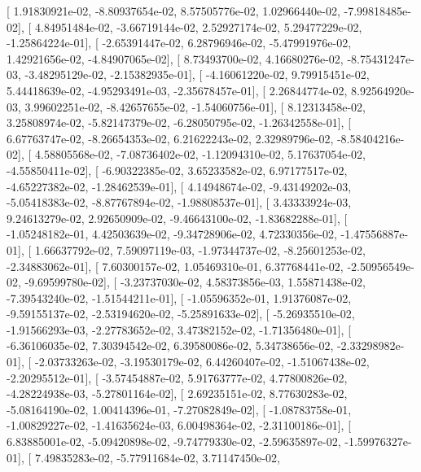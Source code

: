 \documentclass{article}
\begin{document}
       [  1.91830921e-02,  -8.80937654e-02,   8.57505776e-02,
          1.02966440e-02,  -7.99818485e-02],
       [  4.84951484e-02,  -3.66719144e-02,   2.52927174e-02,
          5.29477229e-02,  -1.25864224e-01],
       [ -2.65391447e-02,   6.28796946e-02,  -5.47991976e-02,
          1.42921656e-02,  -4.84907065e-02],
       [  8.73493700e-02,   4.16680276e-02,  -8.75431247e-03,
         -3.48295129e-02,  -2.15382935e-01],
       [ -4.16061220e-02,   9.79915451e-02,   5.44418639e-02,
         -4.95293491e-03,  -2.35678457e-01],
       [  2.26844774e-02,   8.92564920e-03,   3.99602251e-02,
         -8.42657655e-02,  -1.54060756e-01],
       [  8.12313458e-02,   3.25808974e-02,  -5.82147379e-02,
         -6.28050795e-02,  -1.26342558e-01],
       [  6.67763747e-02,  -8.26654353e-02,   6.21622243e-02,
          2.32989796e-02,  -8.58404216e-02],
       [  4.58805568e-02,  -7.08736402e-02,  -1.12094310e-02,
          5.17637054e-02,  -4.55850411e-02],
       [ -6.90322385e-02,   3.65233582e-02,   6.97177517e-02,
         -4.65227382e-02,  -1.28462539e-01],
       [  4.14948674e-02,  -9.43149202e-03,  -5.05418383e-02,
         -8.87767894e-02,  -1.98808537e-01],
       [  3.43333924e-03,   9.24613279e-02,   2.92650909e-02,
         -9.46643100e-02,  -1.83682288e-01],
       [ -1.05248182e-01,   4.42503639e-02,  -9.34728906e-02,
          4.72330356e-02,  -1.47556887e-01],
       [  1.66637792e-02,   7.59097119e-03,  -1.97344737e-02,
         -8.25601253e-02,  -2.34883062e-01],
       [  7.60300157e-02,   1.05469310e-01,   6.37768441e-02,
         -2.50956549e-02,  -9.69599780e-02],
       [ -3.23737030e-02,   4.58373856e-03,   1.55871438e-02,
         -7.39543240e-02,  -1.51544211e-01],
       [ -1.05596352e-01,   1.91376087e-02,  -9.59155137e-02,
         -2.53194620e-02,  -5.25891633e-02],
       [ -5.26935510e-02,  -1.91566293e-03,  -2.27783652e-02,
          3.47382152e-02,  -1.71356480e-01],
       [ -6.36106035e-02,   7.30394542e-02,   6.39580086e-02,
          5.34738656e-02,  -2.33298982e-01],
       [ -2.03733263e-02,  -3.19530179e-02,   6.44260407e-02,
         -1.51067438e-02,  -2.20295512e-01],
       [ -3.57454887e-02,   5.91763777e-02,   4.77800826e-02,
         -4.28224938e-03,  -5.27801164e-02],
       [  2.69235151e-02,   8.77630283e-02,  -5.08164190e-02,
          1.00414396e-01,  -7.27082849e-02],
       [ -1.08783758e-01,  -1.00829227e-02,  -1.41635624e-03,
          6.00498364e-02,  -2.31100186e-01],
       [  6.83885001e-02,  -5.09420898e-02,  -9.74779330e-02,
         -2.59635897e-02,  -1.59976327e-01],
       [  7.49835283e-02,  -5.77911684e-02,   3.71147450e-02,
\end{document}
